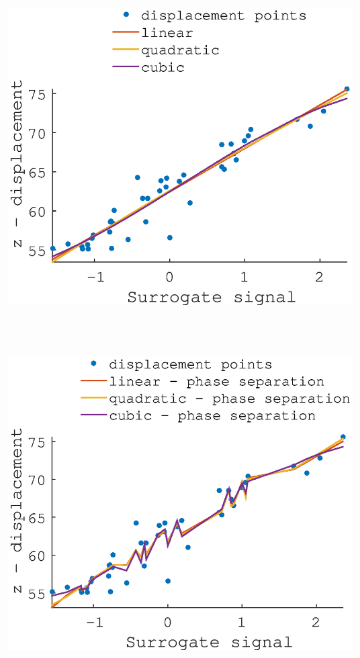 \documentclass[11pt,a4paper,oneside]{report}
\begin{document}
\begin{figure}[H]
  
    \hspace*{-2em}
  \begin{subfigure}[b]{0.33\textwidth}
    \includegraphics[width=\textwidth, trim=0 0 0 110,clip=true]{figures/task2/fit_round1_couch5.eps}
  \end{subfigure}%
    ~ %
  \begin{subfigure}[b]{0.33\textwidth}
    \includegraphics[width=\textwidth, trim=0 0 0 110,clip=true]{figures/task2/fit_round2_couch5.eps}

\end{subfigure}
\end{figure}
\end{document}
